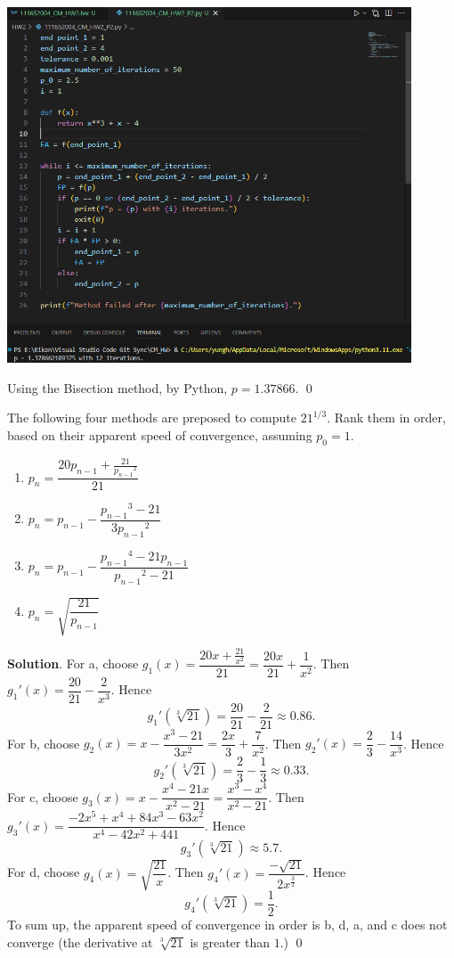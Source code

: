 \documentclass[11pt]{article}
\theoremstyle{break}
\numberwithin{equation}{theorem}
\begin{document}
\begin{center}
    \includegraphics[width=0.9\textwidth]{problem_2_py.png}
\end{center}
Using the Bisection method, by Python, $p=1.37866$. \qed


\newpage
\begin{problem}\label{problem 3}
    The following four methods are preposed to compute $21^{1/3}$. Rank them in order, based on their apparent speed of convergence, assuming $p_0=1$.
    \begin{enumerate}
        \item $p_n = \dfrac{20p_{n-1} + \frac{21}{{p_{n-1}}^2}}{21}$
        \item $p_n = p_{n-1} - \dfrac{{p_{n-1}}^3-21}{3{p_{n-1}}^2}$
        \item $p_n = p_{n-1} - \dfrac{{p_{n-1}}^4 - 21p_{n-1}}{{p_{n-1}}^2-21}$
        \item $p_n=\sqrt{\dfrac{21}{p_{n-1}}}$
    \end{enumerate}
\end{problem}
\textbf{Solution}. For a, choose $g_1(x)=\dfrac{20x+\frac{21}{x^2}}{21}=\dfrac{20x}{21}+\dfrac{1}{x^2}$. Then ${g_1}'(x)=\dfrac{20}{21}-\dfrac{2}{x^3}$. Hence $${g_1}'(\sqrt[3]{21})=\dfrac{20}{21}-\dfrac{2}{21}\approx0.86.$$ For b, choose $g_2(x)=x-\dfrac{x^3-21}{3x^2}=\dfrac{2x}{3}+\dfrac{7}{x^2}$. Then ${g_2}'(x)=\dfrac{2}{3}-\dfrac{14}{x^3}$. Hence
$${g_2}'(\sqrt[3]{21})=\dfrac{2}{3}-\dfrac{1}{3}\approx0.33.$$
For c, choose ${g_3}(x)=x-\dfrac{x^4-21x}{x^2-21}=\dfrac{x^3-x^4}{x^2-21}$. Then ${g_3}'(x)=\dfrac{-2x^5+x^4+84x^3-63x^2}{x^4-42x^2+441}$. Hence $${g_3}'(\sqrt[3]{21})\approx5.7.$$ For d, choose ${g_4}(x)=\sqrt{\dfrac{21}{x}}$. Then ${g_4}'(x)=\dfrac{-\sqrt{21}}{2x^{\frac{3}{2}}}$. Hence $${g_4}'(\sqrt[3]{21})=\dfrac{1}{2}.$$ To sum up, the apparent speed of convergence in order is b, d, a, and c does not converge (the derivative at $\sqrt[3]{21}$ is greater than $1$.) \qed
\end{document}
